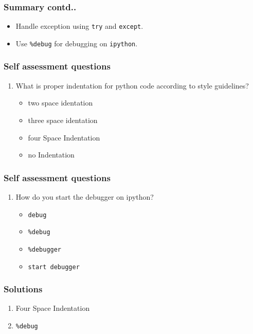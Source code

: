 \documentclass[17pt]{beamer}
\newcounter{saveenumi}
\newcommand{\seti}{\setcounter{saveenumi}{\value{enumi}}}
\newcommand{\conti}{\setcounter{enumi}{\value{saveenumi}}}
\begin{document}
\begin{frame}
\frametitle{Summary contd..}
\label{sec-17.1}
        
\begin{itemize}
\item Handle exception using \texttt{try} and \texttt{except}.\pause
\item Use \texttt{\%debug} for debugging on \texttt{ipython}.
\end{itemize}
\end{frame}
\begin{frame}
\frametitle{Self assessment questions}
\label{sec-18.1}

\begin{enumerate}
\item What is proper indentation for python code according to style guidelines?\pause
	\begin{itemize}
	\item two space identation
	\item three space identation
	\item four Space Indentation
	\item no Indentation
\end{itemize}
\seti
\end{enumerate}
\end{frame}
\begin{frame}
\frametitle{Self assessment questions}
\label{sec-18.2}

\begin{enumerate}
\conti
\item How do you start the debugger on ipython?\pause
	\begin{itemize}
	\item \texttt{debug}
	\item \texttt{\%debug}
	\item \texttt{\%debugger}
	\item \texttt{start debugger}
	\end{itemize}\pause
\end{enumerate}
\end{frame}
\begin{frame}
\frametitle{Solutions}
\label{sec-19}

\begin{enumerate}
\item Four Space Indentation\pause
\vspace{12pt}
\item \texttt{\%debug}
\end{enumerate}
\end{frame}
\end{document}
